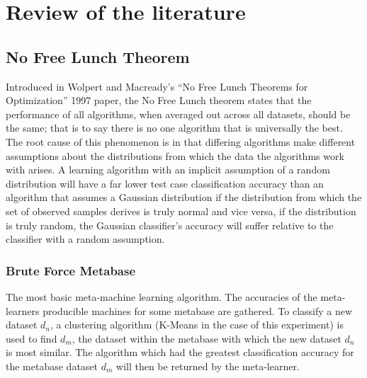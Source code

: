 \chapter{Review of the literature}
\label{Chapter2}
\section{No Free Lunch Theorem}
Introduced in Wolpert and Macready's ``No Free Lunch Theorems for Optimization''
1997 paper, the No Free Lunch theorem states that the performance of all
algorithms, when averaged out across all datasets, should be the same; that is
to say there is no one algorithm that is universally the best. The root cause of
this phenomenon is in that differing algorithms make different assumptions
about the distributions from which the data the algorithms work with arises. A
learning algorithm with an implicit assumption of a random distribution will
have a far lower test case classification accuracy than an algorithm that
assumes a Gaussian distribution if the distribution from which the set of
observed samples derives is truly normal and vice versa, if the
distribution is truly random, the Gaussian classifier's accuracy will suffer
relative to the classifier with a random assumption.
\subsection{Brute Force Metabase}
The most basic meta-machine learning algorithm. The accuracies of the
meta-learners producible machines for some metabase are gathered. To classify
a new dataset $d_n$, a clustering algorithm (K-Means in the case of this experiment) is
used to find $d_m$, the dataset within the metabase with which the new dataset $d_n$ is
most similar. The algorithm which had the greatest classification accuracy for
the metabase dataset $d_m$ will then be returned by the meta-learner.
